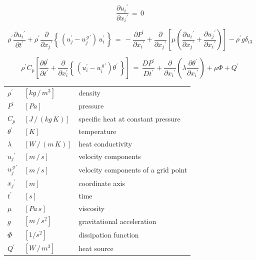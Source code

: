 \begin{equation}
\frac{ \partial{{u}_{i}}^{\prime} }{ \partial{{x}_{i}}^{\prime} }\,{=}\,{0}
\label{eq:continuity eq}
\end{equation}

\begin{equation}
\rho^{\prime} \frac{\partial{{u}_{i}}^{\prime}}{\partial{t}^{\prime}} + \rho^{\prime} \frac{\partial}{\partial{{x}_{j}}^{\prime}} \left \{ \,\left( u_j^\prime - u_j^{\,g\,\prime} \right) \,u_i^\prime\,\right \}
\,{=}\,
- \frac{\partial{P}^{\prime}}{\partial{{x}_{i}}^{\prime}} + \frac{\partial}{\partial{{x}_{j}}^{\prime}} \left[ {\mu\left({ \frac{\partial{{u}_{i}}^{\prime}}{\partial{{x}_{j}}^{\prime}} + \frac{\partial{{u}_{j}}^{\prime}}{\partial{{x}_{i}}^{\prime}}} \right)} \right] - \rho^{\prime} {g}{\delta}_{i3}
\label{eq:NS eq}
\end{equation}

\begin{equation}
\rho^\prime C_p \left[ \frac{\partial \theta^\prime}{\partial t^\prime} + \frac{\partial}{\partial x_i^\prime} \left\{ \, \left( u_i^\prime - u_i^{\,g\,\prime} \right) \theta^\prime \, \right\} \right] 
\,{=}\,
\frac{D{P}^{\prime}}{D{t}^{\prime}} + \frac{\partial}{\partial{{x}_{i}}^{\prime}} \left( {\lambda \frac{\partial{\theta}^{\prime}}{\partial{{x}_{i}}^{\prime}}} \right) + \mu\Phi + {Q}^{\prime}
\label{eq:energy eq}
\end{equation}

\vspace{1.0cm}
\begin{center}
\begin{tabular}{lll}
$\rho^{\prime}$ &  $[kg\,/\,m^3]$ & density \\
$P^{\prime}$ & $[Pa]$ & pressure \\
${C}_{p}$ & $[J\,/\,(kg\,K)]$ & specific heat at constant pressure \\
$\theta^{\prime}$ & $[K]$ & temperature \\
$\lambda$ & $[W\,/\,(m\,K)]$ & heat conductivity \\
${{u}_{j}}^{\prime}$ & $[m\,/\,s]$ & velocity components \\
$u_j^{\,g\,\prime}$ & $[m\,/\,s]$ & velocity components of a grid point \\
${{x}_{j}}^{\prime}$ & $[m]$ & coordinate axis\\
$t^{\prime}$ & $[s]$ & time\\
$\mu$ & $[Pa\,s]$ & viscosity\\
$g$ & $[m\,/\,s^2]$ & gravitational acceleration\\
$\Phi$ & $[1/s^{2}]$ & dissipation function\\
$Q^{\prime}$ & $[W\,/\,m^3]$ & heat source\\
\end{tabular}
\end{center}
\vspace{1.0cm}

